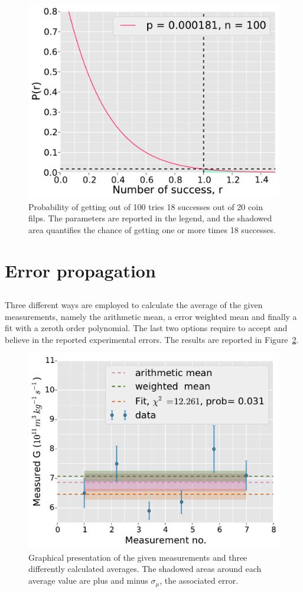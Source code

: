 \documentclass[twocolumn]{article}
\begin{document}
	\begin{figure}[h]
		\begin{center}
			\includegraphics[width=.4\textwidth]{fig/lil_2.pdf}
		\end{center}
		\caption{Probability of getting out of 100 tries 18 successes out of 20 coin filps. The parameters are reported in the legend, and the shadowed area quantifies the chance of getting one or more times 18 successes.}
		\label{fig:lil2}
	\end{figure}
\section{Error propagation} %
\label{sec:error_propagation}
\subsection{} %
	Three different ways are employed to calculate the average of the given measurements, namely the arithmetic mean, a error weighted mean and finally a fit with a zeroth order polynomial.
	The last two options require to accept and believe in the reported experimental errors.
	The results are reported in Figure~\ref{fig:g}.

	\begin{figure}[h!]
		\begin{center}
			\includegraphics[width=.4\textwidth]{fig/g.pdf}
		\end{center}
		\caption{Graphical presentation of the given measurements and three differently calculated averages. The shadowed areas around each average value are plus and minus $\sigma_{\mu}$, the associated error.}
		\label{fig:g}
	\end{figure}
\end{document}
